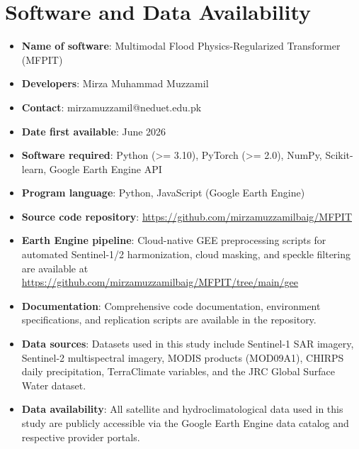 \documentclass[preprint,12pt]{elsarticle}
\begin{document}
\section*{Software and Data Availability}
\begin{itemize}
    \item \textbf{Name of software}: Multimodal Flood Physics-Regularized Transformer (MFPIT)
    \item \textbf{Developers}: Mirza Muhammad Muzzamil
    \item \textbf{Contact}: mirzamuzzamil@neduet.edu.pk
    \item \textbf{Date first available}: June 2026
    \item \textbf{Software required}: Python (>= 3.10), PyTorch (>= 2.0), NumPy, Scikit-learn, Google Earth Engine API
    \item \textbf{Program language}: Python, JavaScript (Google Earth Engine)
    \item \textbf{Source code repository}: \url{https://github.com/mirzamuzzamilbaig/MFPIT}
    \item \textbf{Earth Engine pipeline}: Cloud-native GEE preprocessing scripts for automated Sentinel-1/2 harmonization, cloud masking, and speckle filtering are available at \url{https://github.com/mirzamuzzamilbaig/MFPIT/tree/main/gee}
    \item \textbf{Documentation}: Comprehensive code documentation, environment specifications, and replication scripts are available in the repository.
    \item \textbf{Data sources}: Datasets used in this study include Sentinel-1 SAR imagery, Sentinel-2 multispectral imagery, MODIS products (MOD09A1), CHIRPS daily precipitation, TerraClimate variables, and the JRC Global Surface Water dataset.
    \item \textbf{Data availability}: All satellite and hydroclimatological data used in this study are publicly accessible via the Google Earth Engine data catalog and respective provider portals.
\end{itemize}
\end{document}
